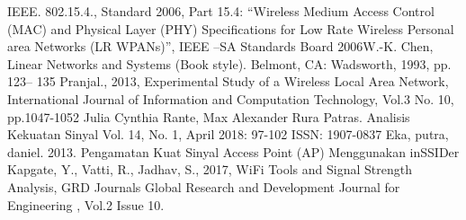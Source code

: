 \documentclass[conference]{IEEEtran}
\begin{document}
\begin{thebibliography}{00}
     IEEE. 802.15.4., Standard 2006, Part 15.4: “Wireless Medium Access Control (MAC) and Physical Layer (PHY) Specifications for Low Rate Wireless
    Personal area Networks (LR WPANs)”, IEEE –SA Standards Board 2006W.-K. Chen, Linear Networks and Systems (Book style). Belmont, CA: Wadsworth,
    1993, pp. 123– 135
     Pranjal., 2013, Experimental Study of a Wireless Local Area Network, International Journal of Information and Computation Technology, Vol.3 No. 10, pp.1047-1052
     Julia Cynthia Rante, Max Alexander Rura Patras. Analisis Kekuatan Sinyal Vol. 14, No. 1, April 2018: 97-102 ISSN: 1907-0837
     Eka, putra, daniel. 2013. Pengamatan Kuat Sinyal Access Point (AP) Menggunakan inSSIDer
     Kapgate, Y., Vatti, R., Jadhav, S., 2017, WiFi Tools and Signal Strength Analysis, GRD Journals Global Research and Development Journal for Engineering , Vol.2 Issue 10.
\end{thebibliography}
\end{document}
